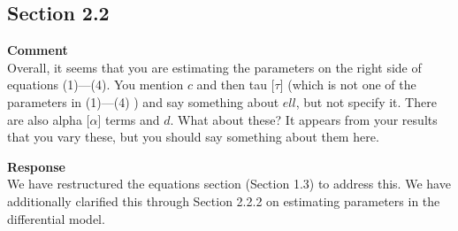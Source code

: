 \subsection{Section 2.2}
\setcounter{rev2-2.2}{1}

\textbf{Comment } \\
Overall, it seems that you are estimating the parameters on the right side of equations (1)—(4).
You mention $ c $ and then tau [$ \tau $] (which is not one of the parameters in (1)—(4) ) and say something about $ ell $, but not specify it.
There are also alpha [$ \alpha $] terms and $ d $.
What about these?
It appears from your results that you vary these, but you should say something about them here.

\textbf{Response } \\
We have restructured the equations section (Section 1.3) to address this.
We have additionally clarified this through Section 2.2.2 on estimating parameters in the differential model.
